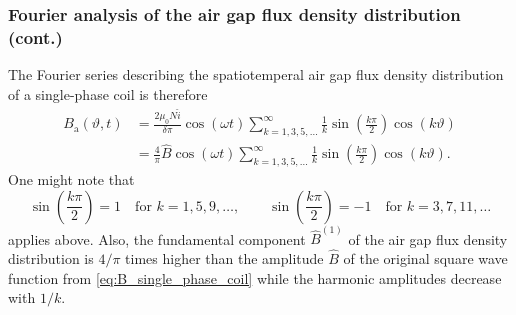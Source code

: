 \begin{frame}
	\frametitle{Fourier analysis of the air gap flux density distribution (cont.)}
        The Fourier series describing the spatiotemperal air gap flux density distribution of a single-phase coil is therefore
    \begin{equation}
        \begin{split}
            B_\mathrm{a}(\vartheta, t) &= \frac{2 \mu_0 N \hat{i}}{\delta \pi}\cos(\omega t)\sum_{k=1,3,5,\ldots}^{\infty}   \frac{1}{k}\sin(\frac{k \pi}{2}) \cos(k \vartheta)\\ &= \frac{4}{\pi} \hat{B} \cos(\omega t)\sum_{k=1,3,5,\ldots}^{\infty}   \frac{1}{k}\sin(\frac{k \pi}{2}) \cos(k \vartheta).
            \label{eq:B_single_phase_coil_fourier_series}
        \end{split}
    \end{equation}
    One might note that $$\sin(\frac{k \pi}{2}) = 1 \quad \mbox{for } k=1,5,9,\ldots, \qquad \sin(\frac{k \pi}{2}) = -1 \quad \mbox{for } k=3,7,11,\ldots$$ applies above.  Also, the fundamental component $\hat{B}^{(1)}$ of the air gap flux density distribution is $4/\pi$ times higher than the amplitude $\hat{B}$ of the original square wave function from \eqref{eq:B_single_phase_coil} while the harmonic amplitudes decrease with $1/k$. 
\end{frame}

